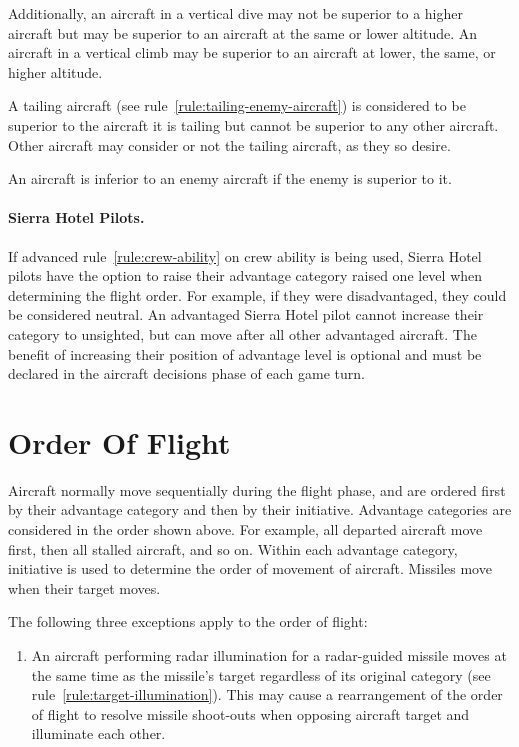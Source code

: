 {Additionally, an aircraft in a vertical dive may not be superior to a higher aircraft but may be superior to an aircraft at the same or lower altitude. An aircraft in a vertical climb may be superior to an aircraft at lower, the same, or higher altitude.

A tailing aircraft (see rule~\ref{rule:tailing-enemy-aircraft}) is considered to be superior to the aircraft it is tailing but cannot be superior to any other aircraft. Other aircraft may consider or not the tailing aircraft, as they so desire.

An aircraft is inferior to an enemy aircraft if the enemy is superior to it.

\paragraph{Sierra Hotel Pilots.} If advanced rule~\ref{rule:crew-ability} on crew ability is being used, Sierra Hotel pilots have the option to raise their advantage category raised one level when determining the flight order. For example, if they were disadvantaged, they could be considered neutral. An advantaged Sierra Hotel pilot cannot increase their category to unsighted, but can move after all other advantaged aircraft. The benefit of increasing their position of advantage level is optional and must be declared in the aircraft decisions phase of each game turn.


\section{Order Of Flight} 

Aircraft normally move sequentially during the flight phase, and are ordered first by their advantage category and then by their initiative. Advantage categories are considered in the order shown above. For example, all departed aircraft move first, then all stalled aircraft, and so on. Within each advantage category, initiative is used to determine the order of movement of aircraft. Missiles move when their target moves.

The following three exceptions apply to the order of flight:

\begin{enumerate}

    \item{} An aircraft performing radar illumination for a radar-guided missile moves at the same time as the missile’s target regardless of its original category (see rule~\ref{rule:target-illumination}). This may cause a rearrangement of the order of flight to resolve missile shoot-outs when opposing aircraft target and illuminate each other.


\end{enumerate}}

